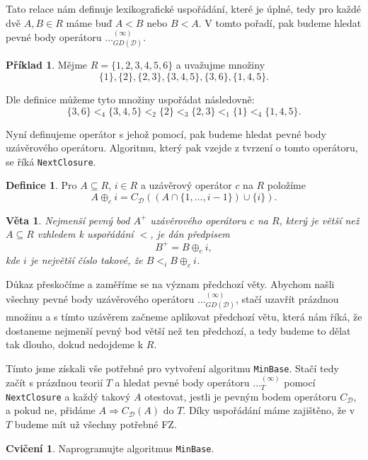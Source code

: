 \documentclass{article}
\newtheorem{theorem}{Věta}
\theoremstyle {definition}
\newtheorem{definition}{Definice}
\newtheorem{example}{Příklad}
\newtheorem{exercise}{Cvičení}
\begin{document}
Tato relace nám definuje lexikografické uspořádání, které je úplné,
tedy pro každé dvě $A,B\in R$ máme buď $A<B$ nebo $B<A$. V tomto
pořadí, pak budeme hledat pevné body operátoru
$\dots^{(\infty)}_{GD(\mathcal{D})}$.

\begin {example}
  Mějme $R= \{1,2,3,4,5,6\}$ a uvažujme množiny $$\{1\}, \{2\},
  \{2,3\}, \{3,4,5\}, \{3,6\}, \{1,4,5\}.$$

  Dle definice můžeme tyto množiny uspořádat následovně:
  $$ \{3,6\} <_4 \{3,4,5\} <_2 \{2\} <_3 \{2,3\} <_1 \{1\} <_4
  \{1,4,5\}.$$
\end {example}

Nyní definujeme operátor s jehož pomocí, pak budeme hledat pevné body
uzávěrového operátoru. Algoritmu, který pak vzejde z tvrzení o tomto
operátoru, se říká \texttt {NextClosure}.

\begin {definition}
  Pro $A\subseteq R$, $i\in R$ a uzávěrový operátor $c$ na $R$
  položíme
  $$ A\oplus_c i = C_{\mathcal D}((A\cap \{1,\dots,i-1\}) \cup \{i\}).$$
\end {definition}

\begin {theorem}
  Nejmenší pevný bod $A^+$ uzávěrového operátoru $c$ na $R$, který je
  větší než $A\subseteq R$ vzhledem k uspořádání $<$, je dán předpisem
  $$ B^+ = B\oplus_c i,$$
  kde $i$ je největší číslo takové, že $B<_i B\oplus_c i$.
\end {theorem}

Důkaz přeskočíme a zaměříme se na význam předchozí věty. Abychom našli
všechny pevné body uzávěrového operátoru
$\dots^{(\infty)}_{GD(\mathcal{D})}$, stačí uzavřít prázdnou množinu a
s tímto uzávěrem začneme aplikovat předchozí větu, která nám říká, že
dostaneme nejmenší pevný bod větší než ten předchozí, a tedy budeme to
dělat tak dlouho, dokud nedojdeme k $R$.

Tímto jsme získali vše potřebné pro vytvoření algoritmu
\texttt{MinBase}. Stačí tedy začít s prázdnou teorií $T$ a hledat
pevné body operátoru $\dots^{(\infty)}_{T}$ pomocí
\texttt{NextClosure} a každý takový $A$ otestovat, jestli je pevným
bodem operátoru $C_{\mathcal{D}}$, a pokud ne, přidáme $A\Rightarrow
C_{\mathcal{D}}(A)$ do $T$. Díky uspořádání máme zajištěno, že v $T$
budeme mít už všechny potřebné FZ.

\begin {exercise}
  Naprogramujte algoritmus \texttt {MinBase}.
\end {exercise}
\end{document}
